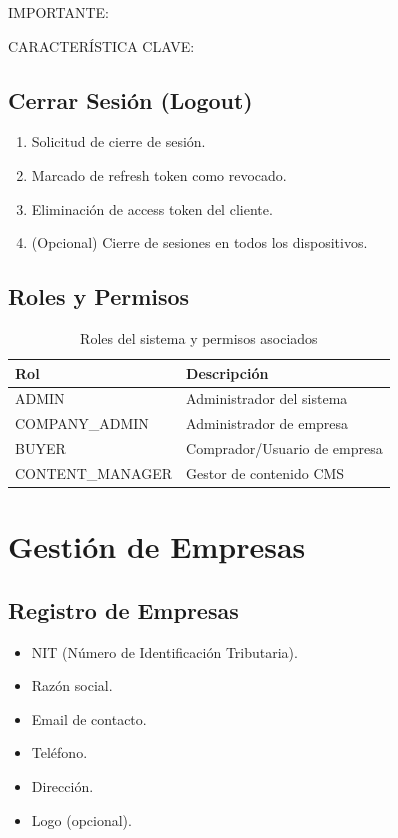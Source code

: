 \documentclass[12pt,a4paper,oneside]{book}
\begin{document}
\begin{alert}{IMPORTANTE:}
\begin{info}{CARACTERÍSTICA CLAVE:}
\subsection{Cerrar Sesión (Logout)}
\begin{enumerate}
    \item Solicitud de cierre de sesión.
    \item Marcado de refresh token como revocado.
    \item Eliminación de access token del cliente.
    \item (Opcional) Cierre de sesiones en todos los dispositivos.
\end{enumerate}

\subsection{Roles y Permisos}
\begin{table}[ht]
    \centering
    \caption{Roles del sistema y permisos asociados}
    \begin{tabular}{@{}ll@{}}
        \toprule
        \textbf{Rol} & \textbf{Descripción} \\
        \midrule
        ADMIN & Administrador del sistema \\
        COMPANY\_ADMIN & Administrador de empresa \\
        BUYER & Comprador/Usuario de empresa \\
        CONTENT\_MANAGER & Gestor de contenido CMS \\
        \bottomrule
    \end{tabular}
\end{table}

\section{Gestión de Empresas}
\label{sec:empresas}

\subsection{Registro de Empresas}
\begin{itemize}
    \item NIT (Número de Identificación Tributaria).
    \item Razón social.
    \item Email de contacto.
    \item Teléfono.
    \item Dirección.
    \item Logo (opcional).
\end{itemize}


\end{info}
\end{alert}
\end{document}
